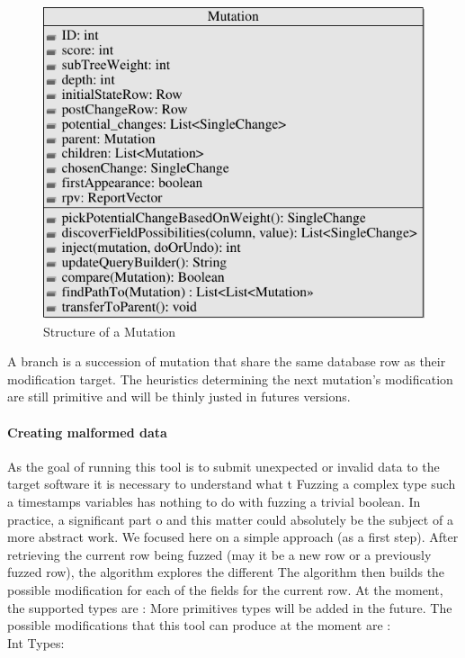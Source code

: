 \documentclass{article}
\begin{document}
\begin{empfile}
\clearpage

\begin{figure} [h!]
\centering
\includegraphics[width=\textwidth]{MutationClassDiagram-1.pdf}
\caption{Structure of a Mutation}
\end{figure}

\bigskip				
				
A branch is a succession of mutation that share the same database row as their modification target.
The heuristics determining the next mutation's modification are still   primitive and will be thinly justed in futures versions.								 
				\paragraph{Creating malformed data} 
As the goal of running this tool is to submit unexpected or invalid data to the target software it is necessary to understand what t
Fuzzing a complex type such a timestamps variables has nothing to do with fuzzing a trivial boolean. In practice, a significant part o
and this matter could absolutely be the subject of a more abstract work. We focused here on a   simple approach (as a first step).
After retrieving the current row being fuzzed (may it be a new row or a previously fuzzed row), the algorithm explores the different
The algorithm then builds the possible modification for each of the fields for the current row.
At the moment, the supported types are : %
More primitives types will be added in the future.
The possible modifications that this tool can produce at the moment are : \\ %
				Int Types:
				\begin{itemize}
		

\end{itemize}
\end{empfile}
\end{document}
